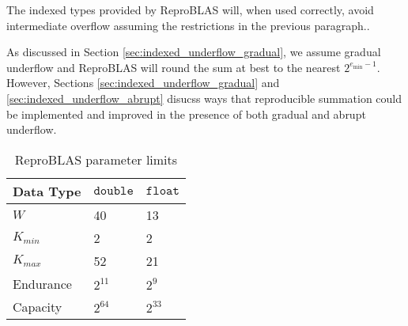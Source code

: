     The indexed types provided by ReproBLAS will, when used correctly, avoid intermediate overflow assuming the restrictions in the previous paragraph..

    As discussed in Section \ref{sec:indexed_underflow_gradual}, we assume gradual underflow and ReproBLAS will round the sum at best to the nearest $2^{e_{\min} - 1}$. However, Sections \ref{sec:indexed_underflow_gradual} and \ref{sec:indexed_underflow_abrupt} disucss ways that reproducible summation could be implemented and improved in the presence of both gradual and abrupt underflow.

    \begin{table}[!htbp]
        \centering
        \caption{ReproBLAS parameter limits}
        \begin{tabular}{| l | l | l |}\hline
            Data Type & $\texttt{double}$ & $\texttt{float}$ \\ \hline
            $W$ & 40 & 13 \\ \hline
            $K_{min}$ & 2 & 2 \\ \hline
            $K_{max}$ & 52 & 21 \\ \hline
            Endurance & $2^{11}$ & $2^9$ \\ \hline
            Capacity & $2^{64}$ & $2^{33}$ \\ \hline
        \end{tabular}
    \end{table}
